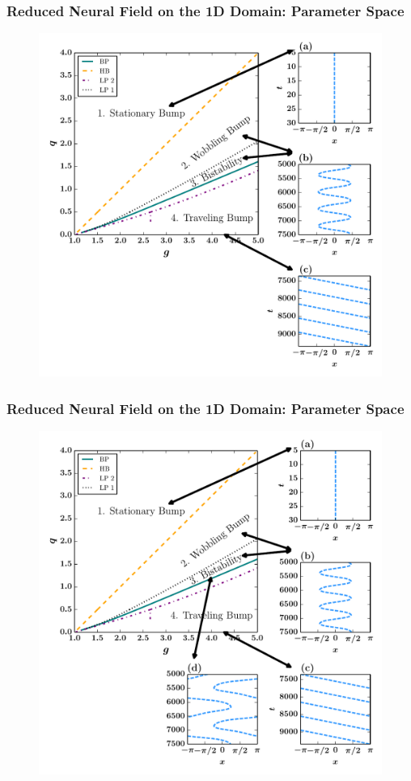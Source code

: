 \documentclass{beamer}
\begin{document}
\begin{frame}
\frametitle{Reduced Neural Field on the 1D Domain: Parameter Space}
\begin{figure}
 \includegraphics[width=.6\textwidth]{oned_phase_2par3.pdf}
\end{figure}
\end{frame}

\begin{frame}
\frametitle{Reduced Neural Field on the 1D Domain: Parameter Space}
\begin{figure}
 \includegraphics[width=.6\textwidth]{oned_phase_2par4.pdf}
\end{figure}
\end{frame}
\end{document}
